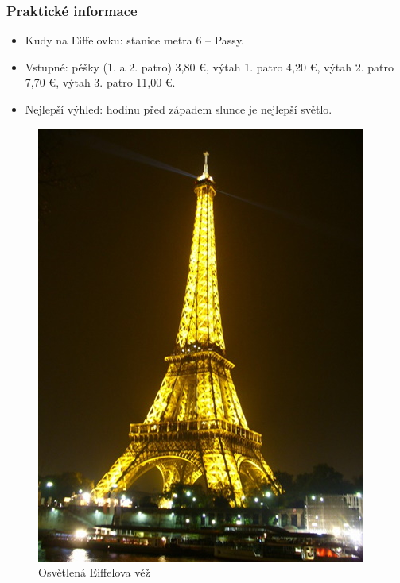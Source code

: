\subsubsection{Praktické informace}
\begin{itemize}
    \item Kudy na Eiffelovku: stanice metra 6 -- Passy.
    \item Vstupné: pěšky (1. a 2. patro) 3,80 €, výtah 1. patro 4,20 €, výtah 2. patro 7,70 €, výtah 3. patro 11,00 €.
    \item Nejlepší výhled: hodinu před západem slunce je nejlepší světlo.
\end{itemize}
\begin{figure}[h!]
\centering
\includegraphics[scale=0.5]{images/obr4E.jpg}
\caption{Osvětlená Eiffelova věž}
\label{vez2}

\end{figure}

